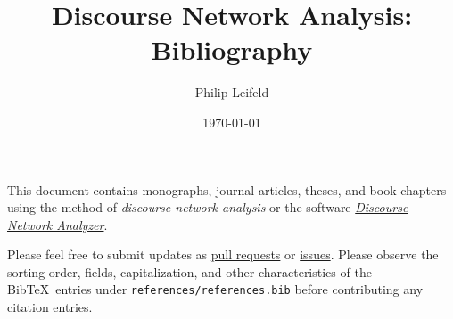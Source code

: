 \documentclass[a4paper, 11pt]{article}
\title{Discourse Network Analysis: Bibliography}
\author{Philip Leifeld}
\date{\today}
\begin{document}
\maketitle

This document contains monographs, journal articles, theses, and book chapters using the method of \emph{discourse network analysis} or the software \href{https://github.com/leifeld/dna/}{\emph{Discourse Network Analyzer}}.

Please feel free to submit updates as \href{https://github.com/leifeld/dna/pulls}{pull requests} or \href{https://github.com/leifeld/dna/issues}{issues}.
Please observe the sorting order, fields, capitalization, and other characteristics of the Bib\TeX\ entries under \verb+references/references.bib+ before contributing any citation entries.

\nocite{*}



\end{document}
